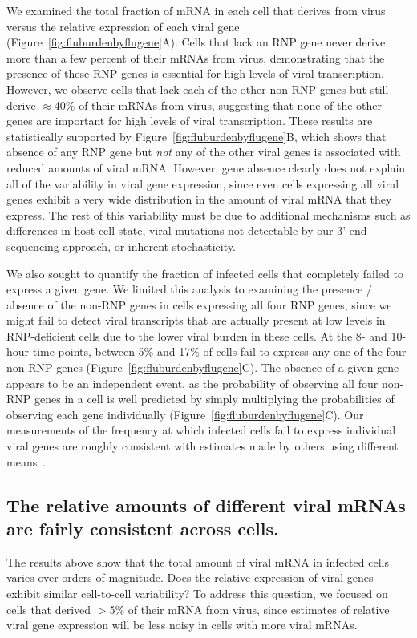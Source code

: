 \documentclass[9pt,lineno]{elife}
\begin{document}
We examined the total fraction of mRNA in each cell that derives from virus versus the relative expression of each viral gene (Figure~\ref{fig:fluburdenbyflugene}A). 
Cells that lack an RNP gene never derive more than a few percent of their mRNAs from virus, demonstrating that the presence of these RNP genes is essential for high levels of viral transcription.
However, we observe cells that lack each of the other non-RNP genes but still derive $\approx$40\% of their mRNAs from virus, suggesting that none of the other genes are important for high levels of viral transcription.
These results are statistically supported by Figure~\ref{fig:fluburdenbyflugene}B, which shows that absence of any RNP gene but \emph{not} any of the other viral genes is associated with reduced amounts of viral mRNA. 
However, gene absence clearly does not explain all of the variability in viral gene expression, since even cells expressing all viral genes exhibit a very wide distribution in the amount of viral mRNA that they express. 
The rest of this variability must be due to additional mechanisms such as differences in host-cell state, viral mutations not detectable by our 3'-end sequencing approach, or inherent stochasticity.  

We also sought to quantify the fraction of infected cells that completely failed to express a given gene.
We limited this analysis to examining the presence / absence of the non-RNP genes in cells expressing all four RNP genes, since we might fail to detect viral transcripts that are actually present at low levels in RNP-deficient cells due to the lower viral burden in these cells.
At the 8- and 10-hour time points, between 5\% and 17\% of cells fail to express any one of the four non-RNP genes (Figure~\ref{fig:fluburdenbyflugene}C).
The absence of a given gene appears to be an independent event, as the probability of observing all four non-RNP genes in a cell is well predicted by simply multiplying the probabilities of observing each gene individually (Figure~\ref{fig:fluburdenbyflugene}C). 
Our measurements of the frequency at which infected cells fail to express individual viral genes are roughly consistent with estimates made by others using different means~\citep{brooke2013most}.
	
\subsection{The relative amounts of different viral mRNAs are fairly consistent across cells.}
The results above show that the total amount of viral mRNA in infected cells varies over orders of magnitude.
Does the relative expression of viral genes exhibit similar cell-to-cell variability?
To address this question, we focused on cells that derived $>$5\% of their mRNA from virus, since estimates of relative viral gene expression will be less noisy in cells with more viral mRNAs.
\end{document}
